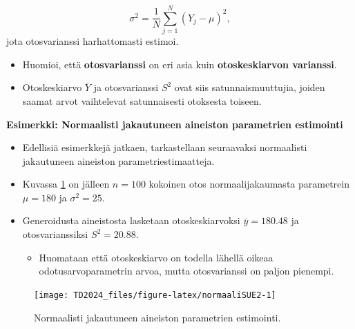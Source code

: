 \documentclass[
]{book}
\providecommand{\tightlist}{%
  \setlength{\itemsep}{0pt}\setlength{\parskip}{0pt}}
\begin{document}
\[
\sigma^2= \frac{1}{N} \sum_{j=1}^{N} (Y_j - \mu)^2,
\]
jota otosvarianssi harhattomasti estimoi.

\begin{itemize}
\item
  Huomioi, että \textbf{otosvarianssi} on eri asia kuin \textbf{otoskeskiarvon varianssi}.
\item
  Otoskeskiarvo \(\bar{Y}\) ja otosvarianssi \(S^2\) ovat siis satunnaismuuttujia, joiden saamat arvot vaihtelevat satunnaisesti otoksesta toiseen.
\end{itemize}

\begin{eblock}{}

\textbf{Esimerkki: Normaalisti jakautuneen aineiston parametrien estimointi}

\begin{itemize}
\tightlist
\item
  Edellisiä esimerkkejä jatkaen, tarkastellaan seuraavaksi normaalisti jakautuneen aineiston parametriestimaatteja.
\item
  Kuvassa \ref{fig:normaaliSUE2} on jälleen \(n=100\) kokoinen otos normaalijakaumasta parametrein \(\mu = 180\) ja \(\sigma^2 = 25\).\\
\item
  Generoidusta aineistosta lasketaan otoskeskiarvoksi \(\bar{y} = 180.48\) ja otosvarianssiksi \(S^2 = 20.88\).

  \begin{itemize}
  \tightlist
  \item
    Huomataan että otoskeskiarvo on todella lähellä oikeaa odotusarvoparametrin arvoa, mutta otosvarianssi on paljon pienempi.
  \end{itemize}
\end{itemize}

\end{eblock}

\FloatBarrier
\begin{figure}

{\centering \texttt{[image: TD2024\_files/figure-latex/normaaliSUE2-1]} 

}

\caption{Normaalisti jakautuneen aineiston parametrien estimointi.}\label{fig:normaaliSUE2}
\end{figure}
\FloatBarrier
\end{document}
